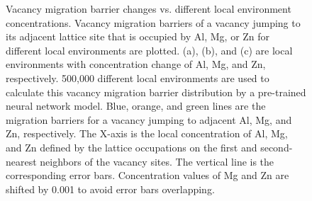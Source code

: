 \begingroup
\begin{figure}[!ht]
  \centering
\caption[Vacancy migration barrier changes vs. different local environment concentrations.]{Vacancy migration barrier changes vs. different local environment concentrations. Vacancy migration barriers of a vacancy jumping to its adjacent lattice site that is occupied by Al, Mg, or Zn for different local environments are plotted. (a), (b), and (c) are local environments with concentration change of Al, Mg, and Zn, respectively. 500,000 different local environments are used to calculate this vacancy migration barrier distribution by a pre-trained neural network model. Blue, orange, and green lines are the migration barriers for a vacancy jumping to adjacent Al, Mg, and Zn, respectively. The X-axis is the local concentration of Al, Mg, and Zn defined by the lattice occupations on the first and second-nearest neighbors of the vacancy sites. The vertical line is the corresponding error bars. Concentration values of Mg and Zn are shifted by 0.001 to avoid error bars overlapping.}
\label{Chap:Al/Vac:fig:conc_E}
\end{figure}
\endgroup


